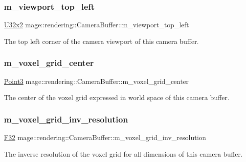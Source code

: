 \subsubsection{\texorpdfstring{m\+\_\+viewport\+\_\+top\+\_\+left}{m\_viewport\_top\_left}}
{\footnotesize\ttfamily \hyperlink{namespacemage_a88e05bff0300120c013285d3dcad95c5}{U32x2} mage\+::rendering\+::\+Camera\+Buffer\+::m\+\_\+viewport\+\_\+top\+\_\+left}

The top left corner of the camera viewport of this camera buffer. \hypertarget{structmage_1_1rendering_1_1_camera_buffer_afd6901f7f7ce2754d921524dae362eb2}{}\label{structmage_1_1rendering_1_1_camera_buffer_afd6901f7f7ce2754d921524dae362eb2} 
\subsubsection{\texorpdfstring{m\+\_\+voxel\+\_\+grid\+\_\+center}{m\_voxel\_grid\_center}}
{\footnotesize\ttfamily \hyperlink{structmage_1_1_point3}{Point3} mage\+::rendering\+::\+Camera\+Buffer\+::m\+\_\+voxel\+\_\+grid\+\_\+center}

The center of the voxel grid expressed in world space of this camera buffer. \hypertarget{structmage_1_1rendering_1_1_camera_buffer_a205a8532012d607326face3d7089b14c}{}\label{structmage_1_1rendering_1_1_camera_buffer_a205a8532012d607326face3d7089b14c} 
\subsubsection{\texorpdfstring{m\+\_\+voxel\+\_\+grid\+\_\+inv\+\_\+resolution}{m\_voxel\_grid\_inv\_resolution}}
{\footnotesize\ttfamily \hyperlink{namespacemage_aa97e833b45f06d60a0a9c4fc22ae02c0}{F32} mage\+::rendering\+::\+Camera\+Buffer\+::m\+\_\+voxel\+\_\+grid\+\_\+inv\+\_\+resolution}

The inverse resolution of the voxel grid for all dimensions of this camera buffer. \hypertarget{structmage_1_1rendering_1_1_camera_buffer_ae50a0f455cd9bad489c65888b5201f3e}{}\label{structmage_1_1rendering_1_1_camera_buffer_ae50a0f455cd9bad489c65888b5201f3e} 
